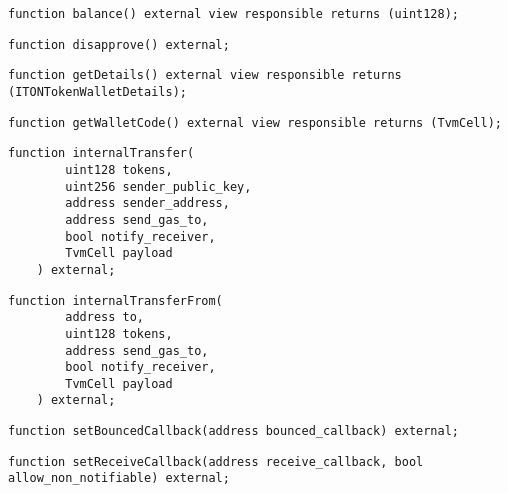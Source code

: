 \begin{lstlisting}[firstnumber=25]
    function balance() external view responsible returns (uint128);
\end{lstlisting}
\vspace{2cm}

\begin{lstlisting}[firstnumber=28]
    function disapprove() external;
\end{lstlisting}
\vspace{2cm}

\begin{lstlisting}[firstnumber=19]
    function getDetails() external view responsible returns (ITONTokenWalletDetails);
\end{lstlisting}
\vspace{2cm}

\begin{lstlisting}[firstnumber=21]
    function getWalletCode() external view responsible returns (TvmCell);
\end{lstlisting}
\vspace{2cm}

\begin{lstlisting}[firstnumber=63]
    function internalTransfer(
        uint128 tokens,
        uint256 sender_public_key,
        address sender_address,
        address send_gas_to,
        bool notify_receiver,
        TvmCell payload
    ) external;
\end{lstlisting}
\vspace{2cm}

\begin{lstlisting}[firstnumber=72]
    function internalTransferFrom(
        address to,
        uint128 tokens,
        address send_gas_to,
        bool notify_receiver,
        TvmCell payload
    ) external;
\end{lstlisting}
\vspace{2cm}

\begin{lstlisting}[firstnumber=31]
    function setBouncedCallback(address bounced_callback) external;
\end{lstlisting}
\vspace{2cm}

\begin{lstlisting}[firstnumber=30]
    function setReceiveCallback(address receive_callback, bool allow_non_notifiable) external;
\end{lstlisting}
\vspace{2cm}

